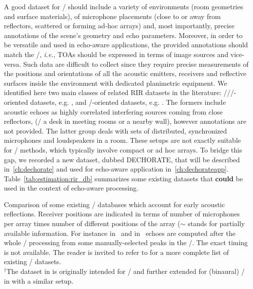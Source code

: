 \mynewline
A good dataset for \AER/ should include a variety of environments (room geometries and surface materials), of microphone placements (close to or away from reflectors, scattered or forming ad-hoc arrays) and, most importantly, precise annotations of the scene's geometry and echo parameters.
Moreover, in order to be versatile and used in echo-aware applications, the provided annotations should match the \ISM/, \textit{i.e.}, TOAs should be expressed in terms of image sources and vice-versa.
Such data are difficult to collect since they require precise measurements of the positions and orientations of all the acoustic emitters, receivers and reflective surfaces inside the environment with dedicated planimetric equipment.
We identified here two main classes of related RIR datasets in the literature:
\SE//\ASR/-oriented datasets, e.g. , and \RooGE/-oriented datasets, e.g. .
The formers include acoustic echoes as highly correlated interfering sources coming from close reflectors, (\eg/ a desk in meeting rooms or a nearby wall), however annotations are not provided.
The latter group deals with sets of distributed, synchronized microphones and loudspeakers in a room.
These setups are not exactly suitable for \SE/ methods, which typically involve compact or ad hoc arrays.
To bridge this gap, we recorded a new dataset, dubbed \ac{DECHORATE}, that will be described in~\cref{ch:dechorate} and used for echo-aware application in~\cref{ch:dechorateapp}.
Table~\ref{tab:estimation:rir_db} summarizes some existing datasets that \textbf{could} be used in the context of echo-aware processing.

\begin{table}[t]

    \begin{fullwidth}
        \centering
        \footnotesize

        

        \caption{Comparison of some existing \RIR/ databases which account for early acoustic reflections.
        Receiver positions are indicated in terms of number of microphones per array times number of different positions of the array ($\sim$ stands for partially available information.
        For instance in~ and in~ echoes are computed after the whole \RooGE/ processing from some manually-selected peaks in the \RIRs/.
        The exact timing is not available.
        The reader is invited to refer to  for a more complete list of existing \RIR/ datasets.
        \protect\\$^{\dagger}$The dataset in  is originally intended for \RooGE/ and further extended for (binaural) \SE/ in  with a similar setup.
        }
        \label{tab:estimation:rir_db}
    \end{fullwidth}


\end{table}


